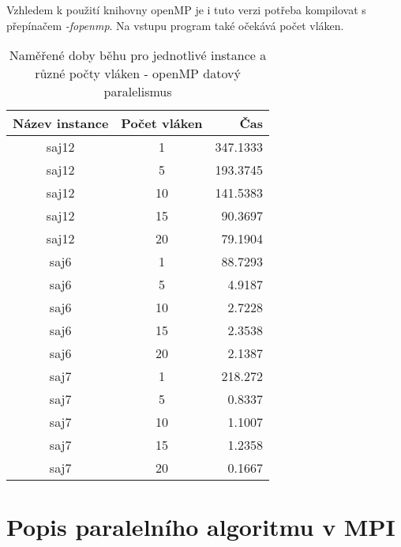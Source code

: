 \documentclass{article} \oddsidemargin=-5mm
\begin{document}
Vzhledem k použití knihovny openMP je i tuto verzi potřeba kompilovat s přepínačem \textit{-fopenmp}. Na vstupu program také očekává počet vláken.

\begin{table}[h]
\centering
\begin{tabular}{|c|c|r|}
\hline
\rowcolor[HTML]{C0C0C0} 
\textbf{Název instance} & \textbf{Počet vláken} & \textbf{Čas} \\ \hline
saj12             & 1                  & 347.1333     \\ \hline
saj12             & 5                  & 193.3745     \\ \hline
saj12             & 10                 & 141.5383     \\ \hline
saj12             & 15                 & 90.3697      \\ \hline
saj12             & 20                 & 79.1904      \\ \hline
saj6              & 1                  & 88.7293      \\ \hline
saj6              & 5                  & 4.9187       \\ \hline
saj6              & 10                 & 2.7228       \\ \hline
saj6              & 15                 & 2.3538       \\ \hline
saj6              & 20                 & 2.1387       \\ \hline
saj7              & 1                  & 218.272      \\ \hline
saj7              & 5                  & 0.8337       \\ \hline
saj7              & 10                 & 1.1007       \\ \hline
saj7              & 15                 & 1.2358       \\ \hline
saj7              & 20                 & 0.1667       \\ \hline
\end{tabular}
\caption{Naměřené doby běhu pro jednotlivé instance a různé počty vláken - openMP datový paralelismus}
\label{table-ompDat}
\end{table}

\clearpage

\section{Popis paralelního algoritmu v MPI}
\end{document}
